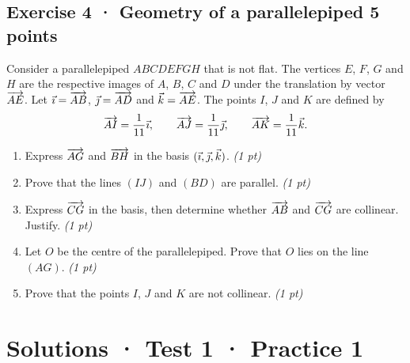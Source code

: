 \subsection*{Exercise 4 · Geometry of a parallelepiped \hfill 5 points}Consider a parallelepiped $ABCDEFGH$ that is not flat. The vertices $E$, $F$, $G$ and $H$ are the respective images of $A$, $B$, $C$ and $D$ under the translation by vector $\overrightarrow{AE}$.
Let $\vec{\imath}=\overrightarrow{AB}$, $\vec{\jmath}=\overrightarrow{AD}$ and $\vec k=\overrightarrow{AE}$.
The points $I$, $J$ and $K$ are defined by
\[\overrightarrow{AI}=\frac1{11}\vec{\imath},\qquad\overrightarrow{AJ}=\frac1{11}\vec{\jmath},\qquad\overrightarrow{AK}=\frac1{11}\vec k.\]

\begin{enumerate}

\item Express $\overrightarrow{AG}$ and $\overrightarrow{BH}$ in the basis $(\vec{\imath},\vec{\jmath},\vec k)$. \hfill\textit{(1 pt)}

\item Prove that the lines $(IJ)$ and $(BD)$ are parallel. \hfill\textit{(1 pt)}

\item Express $\overrightarrow{CG}$ in the basis, then determine whether $\overrightarrow{AB}$ and $\overrightarrow{CG}$ are collinear. Justify. \hfill\textit{(1 pt)}

\item Let $O$ be the centre of the parallelepiped. Prove that $O$ lies on the line $(AG)$. \hfill\textit{(1 pt)}

\item Prove that the points $I$, $J$ and $K$ are not collinear. \hfill\textit{(1 pt)}

\end{enumerate}

\ifprof\clearpage

\section*{Solutions · Test 1 · Practice 1}\label{cor:1-1}

